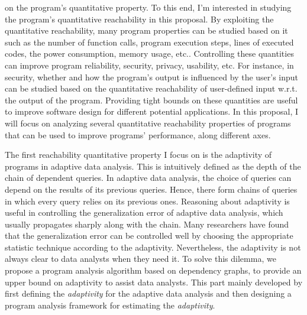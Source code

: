 on the program's quantitative property. 
To this end, I'm interested in studying the program's quantitative reachability in this proposal. 
By exploiting the quantitative reachability,
many program properties can be 
studied based on it
such as the number of function calls,
program execution steps,
lines of executed codes,
the power consumption, memory usage, etc.. 
Controlling these quantities can improve program reliability, security, privacy, usability, etc.
 For instance, in security, whether and how the program's output is influenced by the user's input
 can be studied based on the 
 quantitative reachability
 of user-defined input w.r.t. the output of the program.
Providing tight bounds on these quantities are useful to improve software design for different potential applications. In this proposal, I will focus on analyzing several quantitative reachability properties of programs that can be used to improve programs' performance, along different axes.

The first reachability quantitative property
 I focus on is the adaptivity of programs in adaptive data analysis.
 This is intuitively defined as the depth of the chain of dependent queries. 
 In adaptive data analysis, the choice of queries can depend on the results of its previous queries. 
 Hence, there form chains of queries in which every query relies on its previous ones.
 Reasoning about adaptivity is useful in controlling the generalization error of adaptive data analysis, which usually propagates sharply along with the chain. 
 Many researchers have found that the generalization error can be controlled well by choosing the appropriate statistic technique according to the adaptivity. Nevertheless, the adaptivity is not always clear to data analysts when they need it. To solve this dilemma, we propose a program analysis algorithm based on dependency graphs, to provide an upper bound on adaptivity to assist data analysts.
This part mainly developed by first defining the \emph{adaptivity} for 
 the adaptive data analysis
 and then designing
 a program analysis framework for estimating the \emph{adaptivity}.

